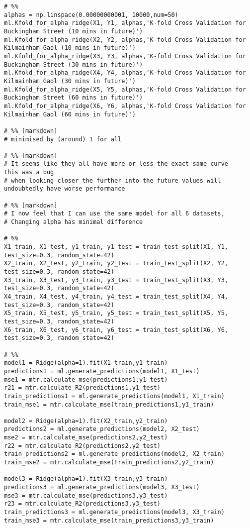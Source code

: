\begin{verbatim}
# %%
alphas = np.linspace(0.00000000001, 10000,num=50)
ml.Kfold_for_alpha_ridge(X1, Y1, alphas,'K-fold Cross Validation for Buckingham Street (10 mins in future)')
ml.Kfold_for_alpha_ridge(X2, Y2, alphas,'K-fold Cross Validation for Kilmainham Gaol (10 mins in future)')
ml.Kfold_for_alpha_ridge(X3, Y3, alphas,'K-fold Cross Validation for Buckingham Street (30 mins in future)')
ml.Kfold_for_alpha_ridge(X4, Y4, alphas,'K-fold Cross Validation for Kilmainham Gaol (30 mins in future)')
ml.Kfold_for_alpha_ridge(X5, Y5, alphas,'K-fold Cross Validation for Buckingham Street (60 mins in future)')
ml.Kfold_for_alpha_ridge(X6, Y6, alphas,'K-fold Cross Validation for Kilmainham Gaol (60 mins in future)')

# %% [markdown]
# minimised by (around) 1 for all

# %% [markdown]
# It seems like they all have more or less the exact same curve  - this was a bug  
# when looking closer the further into the future values will undoubtedly have worse performance

# %% [markdown]
# I now feel that I can use the same model for all 6 datasets,  
# Changing alpha has minimal difference

# %%
X1_train, X1_test, y1_train, y1_test = train_test_split(X1, Y1, test_size=0.3, random_state=42)
X2_train, X2_test, y2_train, y2_test = train_test_split(X2, Y2, test_size=0.3, random_state=42)
X3_train, X3_test, y3_train, y3_test = train_test_split(X3, Y3, test_size=0.3, random_state=42)
X4_train, X4_test, y4_train, y4_test = train_test_split(X4, Y4, test_size=0.3, random_state=42)
X5_train, X5_test, y5_train, y5_test = train_test_split(X5, Y5, test_size=0.3, random_state=42)
X6_train, X6_test, y6_train, y6_test = train_test_split(X6, Y6, test_size=0.3, random_state=42)

# %%
model1 = Ridge(alpha=1).fit(X1_train,y1_train)
predictions1 = ml.generate_predictions(model1, X1_test)
mse1 = mtr.calculate_mse(predictions1,y1_test)
r21 = mtr.calculate_R2(predictions1,y1_test)
train_predictions1 = ml.generate_predictions(model1, X1_train)
train_mse1 = mtr.calculate_mse(train_predictions1,y1_train)

model2 = Ridge(alpha=1).fit(X2_train,y2_train)
predictions2 = ml.generate_predictions(model2, X2_test)
mse2 = mtr.calculate_mse(predictions2,y2_test)
r22 = mtr.calculate_R2(predictions2,y2_test)
train_predictions2 = ml.generate_predictions(model2, X2_train)
train_mse2 = mtr.calculate_mse(train_predictions2,y2_train)

model3 = Ridge(alpha=1).fit(X3_train,y3_train)
predictions3 = ml.generate_predictions(model3, X3_test)
mse3 = mtr.calculate_mse(predictions3,y3_test)
r23 = mtr.calculate_R2(predictions3,y3_test)
train_predictions3 = ml.generate_predictions(model3, X3_train)
train_mse3 = mtr.calculate_mse(train_predictions3,y3_train)


\end{verbatim}
